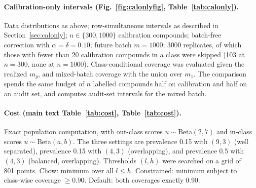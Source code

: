 \documentclass[10pt]{article}
\begin{document}
\paragraph{Calibration-only intervals (Fig.~\ref{fig:calonlyfig}, Table~\ref{tab:calonly}).} Data distributions as above; row-simultaneous intervals as described in Section~\ref{sec:calonly}; $n\in\{300,1000\}$ calibration compounds; batch-free correction with $\alpha=\delta=0.10$; future batch $m=1000$; 3000 replicates, of which those with fewer than 20 calibration compounds in a class were skipped (103 at $n=300$, none at $n=1000$). Class-conditional coverage was evaluated given the realized $m_y$, and mixed-batch coverage with the union over $m_1$. The comparison spends the same budget of $n$ labelled compounds half on calibration and half on an audit set, and computes audit-set intervals for the mixed batch.

\paragraph{Cost (main text Table~\ref{tab:cost}, Table~\ref{tab:cost}).} Exact population computation, with out-class scores $u\sim\mathrm{Beta}(2,7)$ and in-class scores $u\sim\mathrm{Beta}(a,b)$. The three settings are prevalence 0.15 with $(9,3)$ (well separated), prevalence 0.15 with $(4,3)$ (overlapping), and prevalence 0.5 with $(4,3)$ (balanced, overlapping). Thresholds $(l,h)$ were searched on a grid of 801 points. Chow: minimum over all $l\le h$. Constrained: minimum subject to class-wise coverage $\ge0.90$. Default: both coverages exactly 0.90.
\end{document}
